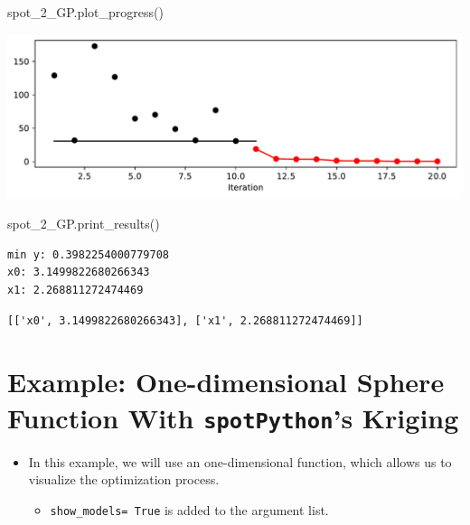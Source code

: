 \documentclass[
  letterpaper,
  DIV=11,
  numbers=noendperiod]{scrreprt}
\newenvironment{Shaded}{\begin{snugshade}}{\end{snugshade}}
\newcommand{\NormalTok}[1]{\textcolor[rgb]{0.00,0.23,0.31}{#1}}
\providecommand{\tightlist}{%
  \setlength{\itemsep}{0pt}\setlength{\parskip}{0pt}}\usepackage{longtable,booktabs,array}
\begin{document}
\begin{Shaded}
\begin{Highlighting}[]
\NormalTok{spot\_2\_GP.plot\_progress()}
\end{Highlighting}
\end{Shaded}

\includegraphics{010_num_spot_sklearn_surrogate_files/figure-pdf/cell-17-output-1.pdf}

\begin{Shaded}
\begin{Highlighting}[]
\NormalTok{spot\_2\_GP.print\_results()}
\end{Highlighting}
\end{Shaded}

\begin{verbatim}
min y: 0.3982254000779708
x0: 3.1499822680266343
x1: 2.268811272474469
\end{verbatim}

\begin{verbatim}
[['x0', 3.1499822680266343], ['x1', 2.268811272474469]]
\end{verbatim}

\section{\texorpdfstring{Example: One-dimensional Sphere Function With
\texttt{spotPython}'s
Kriging}{Example: One-dimensional Sphere Function With spotPython's Kriging}}\label{example-one-dimensional-sphere-function-with-spotpythons-kriging}

\begin{itemize}
\tightlist
\item
  In this example, we will use an one-dimensional function, which allows
  us to visualize the optimization process.

  \begin{itemize}
  \tightlist
  \item
    \texttt{show\_models=\ True} is added to the argument list.
  \end{itemize}
\end{itemize}
\end{document}
